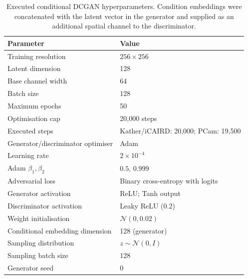 \begin{table}[htbp]
\centering
\small
\setlength{\tabcolsep}{5pt}
\begin{tabular}{ll}
\toprule
Parameter & Value \\
\midrule
Training resolution & $256\times256$ \\
Latent dimension & 128 \\
Base channel width & 64 \\
Batch size & 128 \\
Maximum epochs & 50 \\
Optimisation cap & 20,000 steps \\
Executed steps & Kather/iCAIRD: 20,000; PCam: 19,500 \\
Generator/discriminator optimiser & Adam \\
Learning rate & $2\times10^{-4}$ \\
Adam $\beta_1,\beta_2$ & $0.5,\,0.999$ \\
Adversarial loss & Binary cross-entropy with logits \\
Generator activation & ReLU; Tanh output \\
Discriminator activation & Leaky ReLU ($0.2$) \\
Weight initialisation & $\mathcal{N}(0,0.02)$ \\
Conditional embedding dimension & 128 (generator) \\
Sampling distribution & $z\sim\mathcal{N}(0,I)$ \\
Sampling batch size & 128 \\
Generator seed & 0 \\
\bottomrule
\end{tabular}
\caption{Executed conditional DCGAN hyperparameters. Condition embeddings
were concatenated with the latent vector in the generator and supplied as an
additional spatial channel to the discriminator.}
\label{tab:dcgan-hyperparameters}
\end{table}
